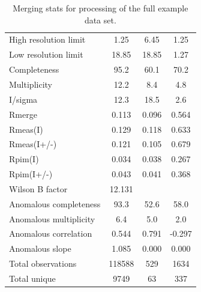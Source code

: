 \documentclass[a4paper, 11pt]{article}
\begin{document}
\begin{table}
\caption{Merging stats for processing of the full example data set.
\label{table-merging-full}}
\begin{tabular}{lccc}
High resolution limit      &       1.25 &    6.45 &   1.25\\
Low resolution limit       &                18.85  & 18.85  &  1.27\\
Completeness               &                95.2   & 60.1  &  70.2\\
Multiplicity               &               12.2    & 8.4   &  4.8\\
I/sigma                    &               12.3    & 18.5   &  2.6\\
Rmerge                     &             0.113  & 0.096 &  0.564\\
Rmeas(I)                   &             0.129  & 0.118 &  0.633\\
Rmeas(I+/-)                &             0.121  & 0.105 &  0.679\\
Rpim(I)                    &             0.034  & 0.038 &  0.267\\
Rpim(I+/-)                 &             0.043  & 0.041 &  0.368\\
Wilson B factor            &            12.131& & \\
Anomalous completeness     &            93.3  &  52.6  &  58.0\\
Anomalous multiplicity     &           6.4    & 5.0  &   2.0\\
Anomalous correlation      &            0.544 &  0.791 & -0.297\\
Anomalous slope            &      1.085 &  0.000 &  0.000\\
Total observations         &       118588 & 529  &   1634\\
Total unique               &         9749  &  63 &     337\\
\end{tabular}
\end{table}
\end{document}
